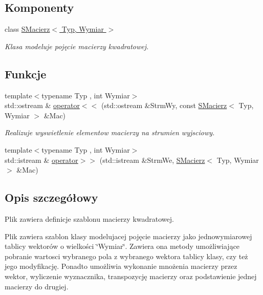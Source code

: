 \subsection*{Komponenty}
\begin{DoxyCompactItemize}
\item 
class \hyperlink{classSMacierz}{S\+Macierz$<$ Typ, Wymiar $>$}
\begin{DoxyCompactList}\small\item\em Klasa modeluje pojęcie macierzy kwadratowej. \end{DoxyCompactList}\end{DoxyCompactItemize}
\subsection*{Funkcje}
\begin{DoxyCompactItemize}
\item 
{\footnotesize template$<$typename Typ , int Wymiar$>$ }\\std\+::ostream \& \hyperlink{SMacierz_8hh_aac60a3b8819068881df97089a29e7846}{operator$<$$<$} (std\+::ostream \&Strm\+Wy, const \hyperlink{classSMacierz}{S\+Macierz}$<$ Typ, Wymiar $>$ \&Mac)
\begin{DoxyCompactList}\small\item\em Realizuje wyswietlenie elementow macierzy na strumien wyjsciowy. \end{DoxyCompactList}\item 
{\footnotesize template$<$typename Typ , int Wymiar$>$ }\\std\+::istream \& \hyperlink{SMacierz_8hh_a15cb0e176b1de7cb59fa98f93c3c55e5}{operator$>$$>$} (std\+::istream \&Strm\+We, \hyperlink{classSMacierz}{S\+Macierz}$<$ Typ, Wymiar $>$ \&Mac)
\end{DoxyCompactItemize}


\subsection{Opis szczegółowy}
Plik zawiera definicje szablonu macierzy kwadratowej. 

Plik zawiera szablon klasy modelujacej pojęcie macierzy jako jednowymiarowej tablicy wektorów o wielkości \char`\"{}\+Wymiar\char`\"{}. Zawiera ona metody umożliwiające pobranie wartosci wybranego pola z wybranego wektora tablicy klasy, czy też jego modyfikację. Ponadto umożliwia wykonanie mnożenia macierzy przez wektor, wyliczenie wyznacznika, transpozycję macierzy oraz podstawienie jednej macierzy do drugiej. 


